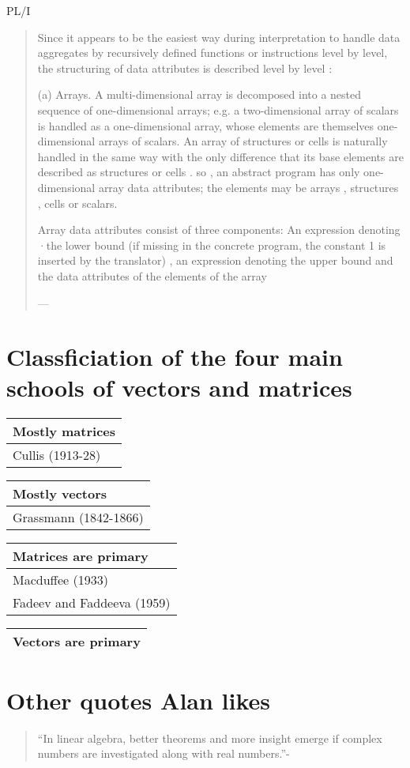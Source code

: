 PL/I
\begin{quote}
Since it appears to be the
easiest way during interpretation to handle data aggregates by recursively defined
functions or instructions level by level, the structuring of data attributes is
described level by level :

(a)
Arrays. A multi-dimensional array is decomposed into a nested sequence of
one-dimensional arrays; e.g. a two-dimensional array of scalars is handled
as a one-dimensional array, whose elements are themselves one-dimensional
arrays of scalars. An array of structures or cells is naturally handled in
the same way with the only difference that its base elements are described
as structures or cells . so , an abstract program has only one-dimensional
array data attributes; the elements may be arrays , structures , cells or
scalars.

Array data attributes consist of three components: An expression denoting
·the lower bound (if missing in the concrete program, the constant 1 is inserted
by the translator) , an expression denoting the upper bound and the
data attributes of the elements of the array

--- \cite[\S 2.3.1, pp. 2-8--9]{Lucas1968}
\end{quote}



\section{Classficiation of the four main schools of vectors and matrices}

\begin{tabular}{l}
Mostly matrices \\
\hline
Cullis (1913-28) \\
\end{tabular}

\begin{tabular}{l}
Mostly vectors \\
\hline
Grassmann (1842-1866) \\
\end{tabular}

\begin{tabular}{l}
Matrices are primary \\
\hline
Macduffee (1933) \\
Fadeev and Faddeeva (1959) \\
\end{tabular}


\begin{tabular}{l}
Vectors are primary \\
\hline
\end{tabular}

\section{Other quotes Alan likes}

\begin{quote}
``In linear algebra, better theorems and more insight emerge if complex numbers are investigated along with real numbers.''-\cite[p. 1]{Axler2015}
\end{quote}
